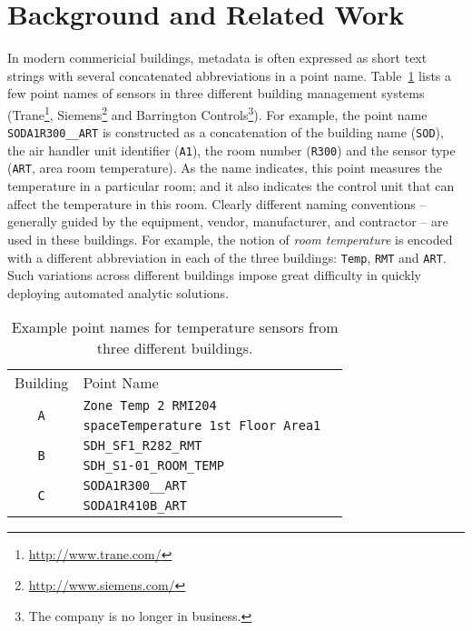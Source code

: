 \section{Background and Related Work}
In modern commericial buildings,
metadata is often expressed as short
text strings with several concatenated abbreviations in a point name. Table~\ref{table:ex} lists
a few point names of sensors in three different building management systems
(Trane\footnote{\url{http://www.trane.com/}}, Siemens\footnote{\url{http://www.siemens.com/}}
and Barrington Controls\footnote{The company is no longer in business.}).
For example, the point name \texttt{SODA1R300\_\_ART} is constructed as a
concatenation of the building name (\texttt{SOD}), the air handler unit
identifier (\texttt{A1}), the room number (\texttt{R300}) and the sensor type
(\texttt{ART}, area room temperature). As the name indicates, this point measures
the temperature in a particular room; and it also indicates the control unit that
can affect the temperature in this room. Clearly different naming conventions --
generally guided by the equipment, vendor, manufacturer,
and contractor --
are used in these buildings. For example, the notion of {\em room temperature} is encoded
with a different abbreviation in each of the three buildings: \texttt{Temp}, \texttt{RMT} and \texttt{ART}.
Such variations across different buildings impose great difficulty in quickly deploying automated analytic
solutions.

\begin{table}[h]
\centering
\begin{tabular}{c|ll}
\cline{1-2}
Building & Point Name & \\
\cline{1-2}
\multirow{2}{*}{\texttt{A}}  & \texttt{Zone Temp 2 RMI204} &  \\
					& \texttt{spaceTemperature 1st Floor Area1} &  \\ \cline{1-2}
\multirow{2}{*}{\texttt{B}} & \texttt{SDH\_SF1\_R282\_RMT} &  \\
                     & \texttt{SDH\_S1-01\_ROOM\_TEMP} &  \\ \cline{1-2}
\multirow{2}{*}{\texttt{C}}  & \texttt{SODA1R300\_\_ART} &  \\
					  & \texttt{SODA1R410B\_ART} &  \\ \cline{1-2}
\end{tabular}
\caption{Example point names for temperature sensors from three different buildings.}
\label{table:ex}
\end{table}


